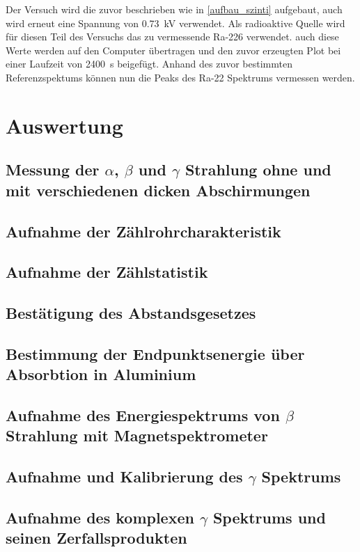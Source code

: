 \documentclass[12pt,english,ngerman]{scrartcl}
\begin{document}
Der Versuch wird die zuvor beschrieben wie in \autoref{aufbau_szinti} aufgebaut, auch wird erneut eine Spannung von \SI{0.73}{\kilo\volt}
verwendet. Als radioaktive Quelle wird für diesen Teil des Versuchs das zu vermessende Ra-226 verwendet. auch diese Werte werden 
auf den Computer übertragen und den zuvor erzeugten Plot bei einer Laufzeit von \SI{2400}{\second} beigefügt. Anhand des zuvor
bestimmten Referenzspektums können nun die Peaks des Ra-22 Spektrums vermessen werden.





\section{Auswertung}\label{sec:Auswertung}

\subsection{Messung der \texorpdfstring{$\alpha$}{alpha}, \texorpdfstring{$\beta$}{beta} und \texorpdfstring{$\gamma$}{gamma} Strahlung ohne und mit verschiedenen dicken Abschirmungen}



\subsection{Aufnahme der Zählrohrcharakteristik}




\subsection{Aufnahme der Zählstatistik}


\subsection{Bestätigung des Abstandsgesetzes}


\subsection{Bestimmung der Endpunktsenergie über Absorbtion in Aluminium}


\subsection{Aufnahme des Energiespektrums von \texorpdfstring{$\beta$}{beta} Strahlung mit Magnetspektrometer}


\subsection{Aufnahme und Kalibrierung des \texorpdfstring{$\gamma$}{gamma} Spektrums}


\subsection{Aufnahme des komplexen \texorpdfstring{$\gamma$}{gamma} Spektrums und seinen Zerfallsprodukten}



\newpage

\printbibliography
\listoffigures
\listoftables
\end{document}
